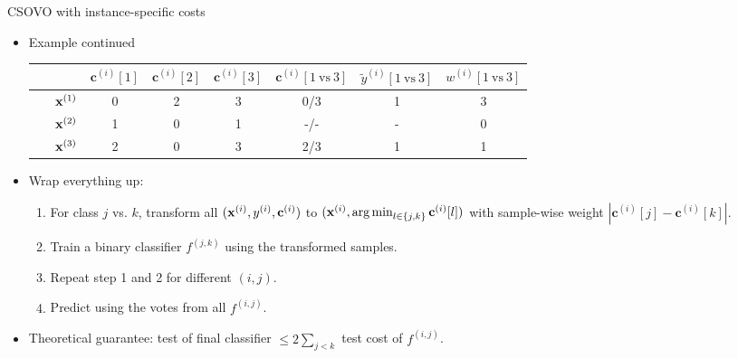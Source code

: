 \documentclass[11pt,compress,t,notes=noshow, xcolor=table]{beamer}
\newcommand{\cv}{\mathbf{c}}    %
\begin{document}
\begin{vbframe}{CSOVO with instance-specific costs}
    \footnotesize
    \begin{itemize}
    \item Example continued
            \begin{center}                                       
        \begin{tabular}{cc|ccc|ccc}\
        			& & $\cv^{(i)}[1]$ & $\cv^{(i)}[2]$ & $\cv^{(i)}[3]$ & $\cv^{(i)}[1 \ \text{vs} \ 3]$ & $\tilde{y}^{( i)}[1 \ \text{vs} \ 3]$ & $w^{(i)}[1 \ \text{vs} \ 3]$\\
        			\hline & $\mathbf{x}^{(1)}$ & 0 & 2 & 3 & 0/3 & 1 & 3\\
        			& $\mathbf{x}^{(2)}$ & 1 & 0 & 1 & -/- & - & 0 \\
                 	& $\mathbf{x}^{(3)}$ & 2 & 0 & 3 & 2/3 & 1 & 1\\
                \end{tabular}
    \end{center}
            \vspace{5pt}

    \item Wrap everything up:
    \begin{enumerate}
        \footnotesize
        \item For class $j$ vs. $k$, transform all $(\xi, \yi, \cv^{(i)})$ to $(\xi, \argmin_{l \in \{j, k\}} \cv^{(i)}[l])$ with sample-wise weight $|\cv^{(i)}[j] - \cv^{(i)}[k]|$.
        \vspace{5pt}
        
        \item Train a binary classifier $f^{(j, k)}$ using the transformed samples.
        \vspace{5pt}
        
        \item Repeat step 1 and 2 for different $(i, j)$.
        \vspace{5pt}
        
        \item Predict using the votes from all $f^{(i, j)}$.
    \end{enumerate}
    \vspace{5pt}

    \item Theoretical guarantee: test of final classifier $\leq 2\sum_{j < k}$ test cost of $f^{(i, j)}$. 
    \end{itemize}
\end{vbframe}
\end{document}
